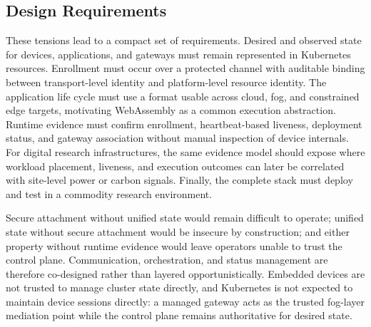 \subsection{Design Requirements}
These tensions lead to a compact set of requirements. Desired and observed state for devices, applications, and gateways must remain represented in Kubernetes resources. Enrollment must occur over a protected channel with auditable binding between transport-level identity and platform-level resource identity. The application life cycle must use a format usable across cloud, fog, and constrained edge targets, motivating WebAssembly as a common execution abstraction. Runtime evidence must confirm enrollment, heartbeat-based liveness, deployment status, and gateway association without manual inspection of device internals. For digital research infrastructures, the same evidence model should expose where workload placement, liveness, and execution outcomes can later be correlated with site-level power or carbon signals. Finally, the complete stack must deploy and test in a commodity research environment.

Secure attachment without unified state would remain difficult to operate; unified state without secure attachment would be insecure by construction; and either property without runtime evidence would leave operators unable to trust the control plane. Communication, orchestration, and status management are therefore co-designed rather than layered opportunistically. Embedded devices are not trusted to manage cluster state directly, and Kubernetes is not expected to maintain device sessions directly: a managed gateway acts as the trusted fog-layer mediation point while the control plane remains authoritative for desired state.
